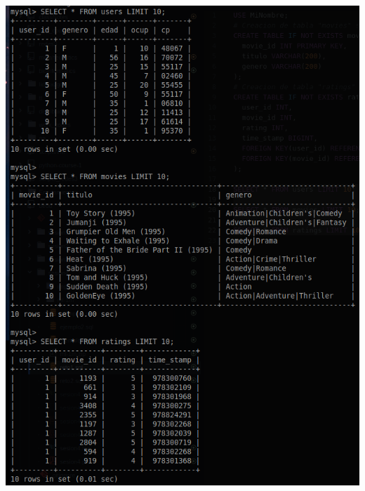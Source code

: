\documentclass[10pt]{article}
\begin{document}
\begin{center}
  \includegraphics[scale=0.25]{imgs/4.png}\\
\end{center}
\end{document}
